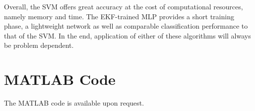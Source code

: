\documentclass[11pt,letterpaper,titlepage]{article}
\numberwithin{equation}{section}
\numberwithin{figure}{section}
\numberwithin{table}{section}
\begin{document}
Overall, the SVM offers great accuracy at the cost of computational resources, namely memory and time. The EKF-trained MLP provides a short training phase, a lightweight network as well as comparable classification performance to that of the SVM. In the end, application of either of these algorithms will always be problem dependent.

\clearpage

\appendix
\section{MATLAB Code}
The MATLAB code is available upon request.

\clearpage


%

\end{document}
